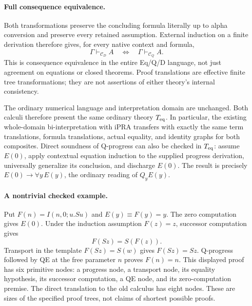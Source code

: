 \paragraph{Full consequence equivalence.}
Both transformations preserve the concluding formula literally up to
alpha conversion and preserve every retained assumption. External
induction on a finite derivation therefore gives, for every native
context and formula,
\[
             \Gamma\vdash_{\mathcal C_D}A
             \quad\Longleftrightarrow\quad
             \Gamma\vdash_{\mathcal C_Q}A.
\]
This is consequence equivalence in the entire Eq/Q/D language, not just
agreement on equations or closed theorems. Proof translations are effective
finite tree transformations; they are not assertions of either theory's
internal consistency.

The ordinary numerical language and interpretation domain are unchanged.
Both calculi therefore present the same ordinary theory $T_{\rm eq}$.
In particular, the existing whole-domain bi-interpretation with iPRA
transfers with exactly the same term translations, formula translations,
actual equality, and identity graphs for both composites. Direct
soundness of Q-progress can also be checked in $T_{\rm eq}$: assume
$E(0)$, apply contextual equation induction to the supplied progress
derivation, universally generalize its conclusion, and discharge $E(0)$.
The result is precisely $E(0)\to\forall y\,E(y)$, the ordinary reading
of $Q_yE(y)$.

\paragraph{A nontrivial checked example.}
Put $F(n)=I(n,0;u.Su)$ and $E(y)\equiv F(y)=y$. The zero computation
gives $E(0)$. Under the induction assumption $F(z)=z$, successor
computation gives
\[
                       F(Sz)=S(F(z)).
\]
Transport in the template $F(Sz)=S(w)$ gives $F(Sz)=Sz$.
Q-progress followed by QE at the free parameter $n$ proves $F(n)=n$.
This displayed proof has six primitive nodes: a progress node, a transport
node, its equality hypothesis, its successor computation, a QE node, and
its zero-computation premise. The direct translation to the old calculus
has eight nodes. These are sizes of the specified proof trees, not claims
of shortest possible proofs.

